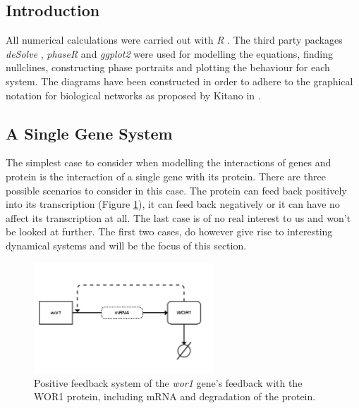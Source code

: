 \documentclass[]{article}
\begin{document}
   \subsection{Introduction}
        All numerical calculations were carried out with \textit{R} \cite{R}. The third party packages \textit{deSolve} \cite{deSolve}, \textit{phaseR} \cite{phaseR} and \textit{ggplot2} \cite {ggplot} were used for modelling the equations, finding nullclines, constructing phase portraits and plotting the behaviour for each system. The diagrams have been constructed in order to adhere to the graphical notation for biological networks as proposed by Kitano in \cite{standardNotation}.
	            
        \subsection{A Single Gene System} 
        The simplest case to consider when modelling the interactions of genes and protein is the interaction of a single gene with its protein. There are three possible scenarios to consider in this case. The protein can feed back positively into its transcription (Figure \ref{singlePositive}), it can feed back negatively or it can have no affect its transcription at all. The last case is of no real interest to us and won't be looked at further. The first two cases, do however give rise to interesting dynamical systems and will be the focus of this section. 
        	     
        \begin{figure}[h!]
        \centering
        \includegraphics[width=0.6\textwidth]{./figures/singlePositive.png}
        \caption{Positive feedback system of the \textit{wor1} gene's feedback with the WOR1 protein, including mRNA and degradation of the protein.}
        \label{singlePositive}
        \end{figure}            
\end{document}
